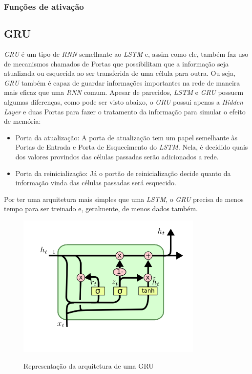 \subsubsection{Funções de ativação}

\subsection{\acrfull{GRU}}


\textit{\acrshort{GRU}} é um tipo de \textit{\acrshort{RNN}} semelhante ao \textit{\acrshort{LSTM}} e, assim como ele, também faz uso de mecanismos chamados de Portas que possibilitam que a informação seja atualizada ou esquecida ao ser transferida de uma célula para outra. Ou seja, \textit{\acrshort{GRU}} também é capaz de guardar informações importantes na rede de maneira mais eficaz que uma \textit{\acrshort{RNN}} comum. Apesar de parecidos, \textit{\acrshort{LSTM}} e \textit{\acrshort{GRU}} possuem algumas diferenças, como pode ser visto abaixo, o \textit{\acrshort{GRU}} possui apenas a \textit{Hidden Layer} e duas Portas para fazer o tratamento da informação para simular o efeito de memória:

\begin{itemize}
    \item Porta da atualização: A porta de atualização tem um papel semelhante às Portas de Entrada e Porta de Esquecimento do \textit{\acrshort{LSTM}}. Nela, é decidido quais dos valores provindos das células passadas serão adicionados a rede.
    \item Porta da reinicialização: Já o portão de reinicialização decide quanto da informação vinda das células passadas será esquecido.
\end{itemize}

Por ter uma arquitetura mais simples que uma \textit{\acrshort{LSTM}}, o \textit{\acrshort{GRU}} precisa de menos tempo para ser treinado e, geralmente, de menos dados também.

\begin{figure}[htbp]
    \centering
    \includegraphics[scale=1.0]{monography/img/GRU.png}
    \label{figure:gru}
    \caption[Representação da arquitetura de uma GRU]{Representação da arquitetura de uma GRU\footnotemark}
\end{figure}